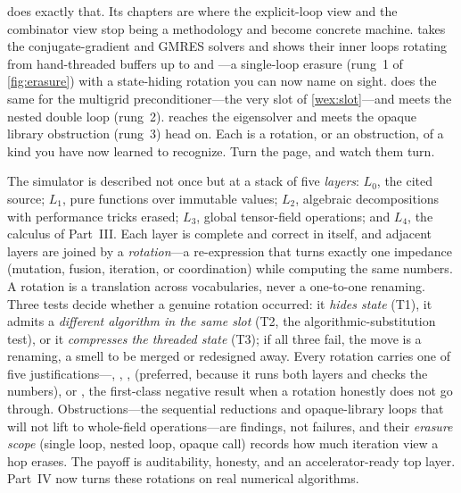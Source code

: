  does exactly that. Its chapters are where the
explicit-loop view and the combinator view stop being a methodology and become
concrete machine.  takes the conjugate-gradient and GMRES solvers
and shows their inner loops rotating from hand-threaded buffers up to
 and ---a single-loop erasure (rung~1 of
\cref{fig:erasure}) with a state-hiding rotation you can now name on sight.
 does the same for the multigrid preconditioner---the very
 slot of \cref{wex:slot}---and meets the nested double loop
(rung~2).  reaches the eigensolver and meets the opaque
library obstruction (rung~3) head on. Each is a rotation, or an obstruction, of a
kind you have now learned to recognize. Turn the page, and watch them turn.

\summarysection
The simulator is described not once but at a stack of five \emph{layers}: $L_0$,
the cited source; $L_1$, pure functions over immutable values; $L_2$, algebraic
decompositions with performance tricks erased; $L_3$, global tensor-field
operations; and $L_4$, the calculus of Part~III. Each layer is complete and
correct in itself, and adjacent layers are joined by a \emph{rotation}---a
re-expression that turns exactly one impedance (mutation, fusion, iteration, or
coordination) while computing the same numbers. A rotation is a translation across
vocabularies, never a one-to-one renaming. Three tests decide whether a genuine
rotation occurred: it \emph{hides state} (T1), it admits a \emph{different
algorithm in the same slot} (T2, the algorithmic-substitution test), or it
\emph{compresses the threaded state} (T3); if all three fail, the move is a
renaming, a smell to be merged or redesigned away. Every rotation carries one of
five justifications---, , ,
 (preferred, because it runs both layers and checks the
numbers), or , the first-class negative result when a rotation
honestly does not go through. Obstructions---the sequential reductions and
opaque-library loops that will not lift to whole-field operations---are findings,
not failures, and their \emph{erasure scope} (single loop, nested loop, opaque
call) records how much iteration view a hop erases. The payoff is auditability,
honesty, and an accelerator-ready top layer. Part~IV now turns these rotations on
real numerical algorithms.


